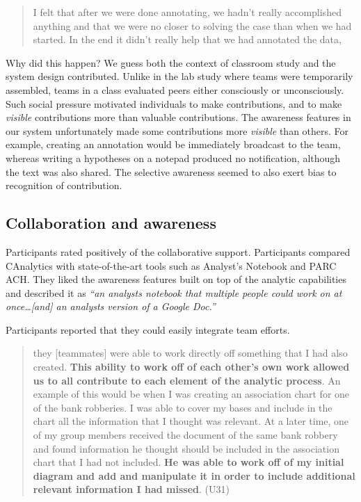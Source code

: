 \documentclass[]{article}
\begin{document}
\begin{quote}
I felt that after we were done annotating, we hadn't really accomplished
anything and that we were no closer to solving the case than when we had
started. In the end it didn't really help that we had annotated the
data,
\end{quote}

Why did this happen? We guess both the context of classroom study and
the system design contributed. Unlike in the lab study where teams were
temporarily assembled, teams in a class evaluated peers either
consciously or unconsciously. Such social pressure motivated individuals
to make contributions, and to make \emph{visible} contributions more
than valuable contributions. The awareness features in our system
unfortunately made some contributions more \emph{visible} than others.
For example, creating an annotation would be immediately broadcast to
the team, whereas writing a hypotheses on a notepad produced no
notification, although the text was also shared. The selective awareness
seemed to also exert bias to recognition of contribution.

\subsection{Collaboration and
awareness}\label{collaboration-and-awareness}

Participants rated positively of the collaborative support. Participants
compared CAnalytics with state-of-the-art tools such as Analyst's
Notebook and PARC ACH. They liked the awareness features built on top of
the analytic capabilities and described it as \emph{``an analysts
notebook that multiple people could work on at once\ldots{}{[}and{]} an
analysts version of a Google Doc.''}

Participants reported that they could easily integrate team efforts.

\begin{quote}
they {[}teammates{]} were able to work directly off something that I had
also created. \textbf{This ability to work off of each other's own work
allowed us to all contribute to each element of the analytic process}.
An example of this would be when I was creating an association chart for
one of the bank robberies. I was able to cover my bases and include in
the chart all the information that I thought was relevant. At a later
time, one of my group members received the document of the same bank
robbery and found information he thought should be included in the
association chart that I had not included. \textbf{He was able to work
off of my initial diagram and add and manipulate it in order to include
additional relevant information I had missed}. (U31)
\end{quote}
\end{document}
